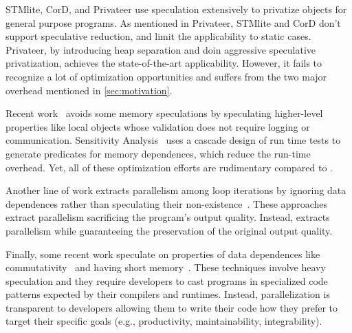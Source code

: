 STMlite, CorD, and Privateer use speculation extensively to privatize
objects for general purpose programs. As mentioned in Privateer, STMlite
and CorD don't support speculative reduction, and limit the applicability
to static cases. Privateer, by introducing heap separation and doin
aggressive speculative privatization, achieves the state-of-the-art
applicability. However, it fails to recognize a lot of optimization
opportunities and suffers from the two major overhead mentioned in
\ref{sec:motivation}.

Recent work~\cite{ctian:2008:micro,johnson:12:pldi,kim:12:cgo} avoids some
memory speculations by speculating higher-level properties like local
objects whose validation does not require logging or communication.
Sensitivity Analysis~\cite{Rus:07:ics} uses a cascade design of run time
tests to generate predicates for memory dependences, which reduce the
run-time overhead. Yet, all of these optimization efforts are rudimentary
compared to \namensp.

Another line of work extracts parallelism among loop iterations by ignoring data dependences rather than speculating their non-existence~\cite{campanoni:2015:cgo,Udupa:2011:AEB:1993498.1993555,misailovic2013parallelizing}.
These approaches extract parallelism sacrificing the program's output quality.
Instead, \name extracts parallelism while guaranteeing the preservation of the original output quality.

Finally, some recent work speculate on properties of data dependences like commutativity~\cite{kulkarni:07:pldi,Nguyen:2014:DGO:2541940.2541964} and having short memory~\cite{Deiana:2018:UPN:3173162.3173181}.
These techniques involve heavy speculation and they require developers to cast programs in specialized code patterns expected by their compilers and runtimes.
Instead, \name parallelization is transparent to developers allowing them to write their code how they prefer to target their specific goals (e.g., productivity, maintainability, integrability).


